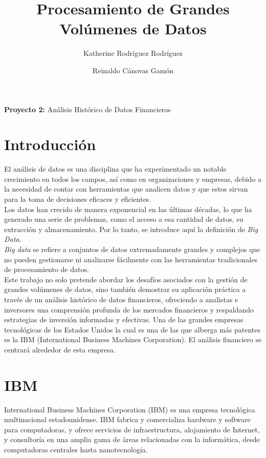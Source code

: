 \documentclass{article}
\begin{document}
	\title{\textbf{Procesamiento de Grandes Volúmenes de Datos}}
	\author{Katherine Rodríguez Rodríguez \and Reinaldo Cánovas Gamón}
	\date{} 
	
	\maketitle
	
	\begin{center}
		\textbf{Proyecto 2:} Análisis Histórico de Datos Financieros\\
	\tableofcontents
    \section{Introducción}
\end{center}
    \begin{flushleft}
    	El análisis de datos es una disciplina que ha experimentado un notable crecimiento en todos los campos, así como en organizaciones y empresas, debido a la necesidad de contar con herramientas que analicen datos y que estos sirvan para la toma de decisiones eficaces y eficientes.  \\
    	Los datos han crecido de manera exponencial en las últimas décadas, lo que ha generado una serie de problemas, como el acceso a esa cantidad de datos, su extracción y almacenamiento. Por lo tanto, se introduce aquí la definición de \textit{Big Data}. \\
    \textit{Big data} se refiere a conjuntos de datos extremadamente grandes y complejos que no pueden gestionarse ni analizarse fácilmente con las herramientas tradicionales de procesamiento de datos.  \\
    	Este trabajo no solo pretende abordar los desafíos asociados con la gestión de grandes volúmenes de datos, sino también demostrar su aplicación práctica a través de un análisis histórico de datos financieros, ofreciendo a analistas e inversores una comprensión profunda de los mercados financieros y respaldando estrategias de inversión informadas y efectivas. Una de las grandes empresas tecnológicas de los Estados Unidos la cual es una de las que alberga más patentes es la IBM (International Business Machines Corporation). El análisis financiero se centrará alrededor de esta empresa.
    \end{flushleft}
    \section{IBM}
    International Business Machines Corporation (IBM) es una empresa tecnológica multinacional estadounidense. IBM fabrica y comercializa hardware y software para computadoras, y ofrece servicios de infraestructura, alojamiento de Internet, y consultoría en una amplia gama de áreas relacionadas con la informática, desde computadoras centrales hasta nanotecnología.
\end{document}
